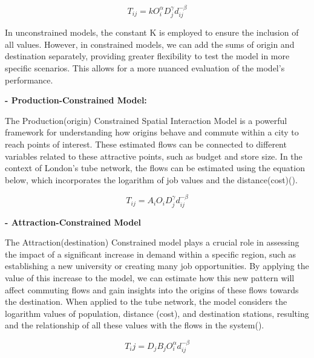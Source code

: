 \documentclass[10pt]{report}
\numberwithin{figure}{section}
\numberwithin{table}{section}
\begin{document}
\begin{equation} \tag{1}
T_{ij} = k O_i^\alpha  D_j^\gamma  d_{ij}^{-\beta}
\end{equation}

\vspace{5mm} %

In unconstrained models, the constant K is employed to ensure the inclusion of all values. However, in constrained models, we can add the sums of origin and destination separately, providing greater flexibility to test the model in more specific scenarios. This allows for a more nuanced evaluation of the model's performance.

\vspace{5mm} %

\textbf{- Production-Constrained Model:}

The Production(origin) Constrained Spatial Interaction Model is a powerful framework for understanding how origins behave and commute within a city to reach points of interest. These estimated flows can be connected to different variables related to these attractive points, such as budget and store size. In the context of London's tube network, the flows can be estimated using the equation below, which incorporates the logarithm of job values and the distance(cost)(\cite{pooler_extended_1994}).

\begin{equation} \label{eq:1} \tag{2}
T_{ij} = A_i O_i D_j^\gamma d_{ij}^{-\beta}
\end{equation}

\vspace{5mm} %

\textbf{- Attraction-Constrained Model}

The Attraction(destination) Constrained model plays a crucial role in assessing the impact of a significant increase in demand within a specific region, such as establishing a new university or creating many job opportunities. By applying the value of this increase to the model, we can estimate how this new pattern will affect commuting flows and gain insights into the origins of these flows towards the destination. When applied to the tube network, the model considers the logarithm values of population, distance (cost), and destination stations,  resulting and the relationship of all these values with the flows in the system(\cite{pooler_extended_1994}).


\begin{equation} \label{eq:5} \tag{3}
T_ij = D_j B_j O_i^\alpha d_{ij}^{-\beta}
\end{equation}
\end{document}
